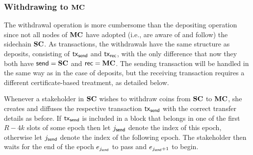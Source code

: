 \subsubsection{Withdrawing to $\mathbf{MC}$}

The withdrawal operation is more cumbersome than the depositing
operation since not all nodes of $\mathbf{MC}$ have adopted (i.e., are aware of and follow) the
sidechain $\mathbf{SC}$.
As transactions, the withdrawals have the same structure as deposits, consisting
of $\mathsf{tx}_{\mathsf{send}}$ and $\mathsf{tx}_{\mathsf{rec}}$, with the only difference
that now they both have $\mathsf{send}=\mathbf{SC}$ and $\mathsf{rec}=\mathbf{MC}$.
The sending transaction will be handled in the same way as in the case of
deposits, but the receiving transaction requires a different certificate-based
treatment, as detailed below.

    Whenever a stakeholder in $\mathbf{SC}$ wishes to withdraw coins from $\mathbf{SC}$
    to $\mathbf{MC}$, she creates and diffuses the respective transaction $\mathsf{tx}_{\mathsf{send}}$
    with the correct transfer details as before.
    If $\mathsf{tx}_{\mathsf{send}}$ is included in a block that belongs in one of the first
    $R-4k$ slots of some epoch then let $j_{\mathsf{send}}$ denote the index of this epoch,
    otherwise let $j_{\mathsf{send}}$ denote the index of the following epoch.
    The stakeholder then waits for the end of the epoch $e_{j_{\mathsf{send}}}$ to pass and
    $e_{j_{\mathsf{send}}+1}$ to begin.

